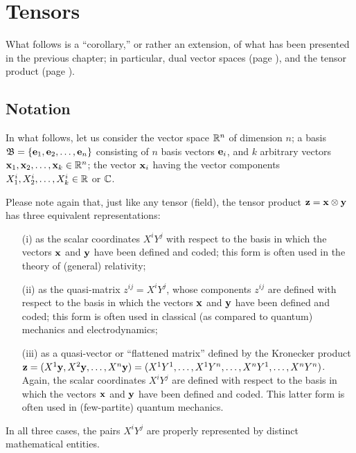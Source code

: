 \chapter{Tensors}
\label{ch:t}


What follows is a ``corollary,'' or rather an extension,  of what has been presented in the previous chapter; in particular, dual vector spaces
(page
\pageref{2011-m-dvs}),
and the tensor product
(page
\pageref{2011-m-tensorp}).

\section{Notation}

In what follows, let us consider the vector space ${\Bbb R}^n$ of dimension $n$;
a basis
${\mathfrak B}=\{{\bf e}_1,{\bf e}_2,\ldots ,{\bf e}_n\}$ consisting of
$n$ basis vectors ${\bf e}_i$,
and $k$ arbitrary vectors
${\bf x}_1,{\bf x}_2,\ldots ,{\bf x}_k\in {\Bbb R}^n$;
the vector ${\bf x}_i$ having the vector components
$X^i_1,X^i_2,\ldots ,X^i_k\in {\Bbb R}$ or $ {\Bbb C}$.


Please note again that,
just like any tensor (field), the tensor product ${\bf z} = {\bf x} \otimes {\bf y}$     has three equivalent  representations:
\begin{itemize}
\item[(i)]
as the scalar coordinates $X^iY^j$ with respect to the basis in which the vectors ${\bf  x}$ and ${\bf y}$ have been defined and coded;
this form is often used in the theory of (general) relativity;
\item[(ii)]
as the quasi-matrix $z^{ij}  =X^iY^j$, whose components $z^{ij}$ are
defined with respect to the basis in which the vectors ${\bf  x}$ and ${\bf y}$ have been defined and coded;
this form is often used in classical (as compared to quantum) mechanics and electrodynamics;
\item[(iii)]
as a quasi-vector or ``flattened matrix'' defined by the Kronecker product
${\bf z} = (X^1  {\bf y}, X^2  {\bf y}, \ldots , X^n  {\bf y})=
(X^1  { Y}^1, \ldots ,X^1  { Y}^n, \ldots  ,X^n  { Y}^1, \ldots , X^n  { Y}^n)
$. Again, the scalar coordinates $X^iY^j$ are defined
with respect to the basis in which the vectors ${\bf  x}$ and ${\bf y}$ have been defined and coded.
This latter form is often used in (few-partite) quantum mechanics.
\end{itemize}
In all three cases, the pairs $X^iY^j$  are properly represented by distinct mathematical entities.


